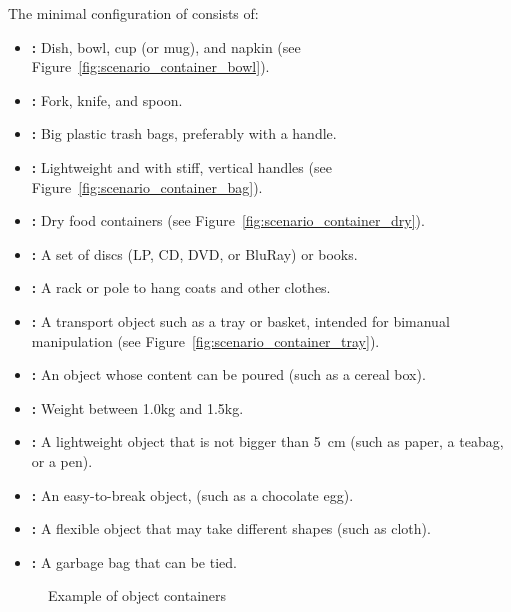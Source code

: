 The minimal configuration of \KnownObjects{} consists of:
\begin{itemize}
	\item \textbf{:} Dish, bowl, cup (or mug), and napkin (see Figure~\ref{fig:scenario_container_bowl}).
	\item \textbf{:} Fork, knife, and spoon.
	\item \textbf{:} Big plastic trash bags, preferably with a handle.
	\item \textbf{:} Lightweight and with stiff, vertical handles (see Figure~\ref{fig:scenario_container_bag}).
	\item \textbf{:} Dry food containers (see Figure~\ref{fig:scenario_container_dry}).
	\item \textbf{:} A set of discs (LP, CD, DVD, or BluRay) or books.
	\item \textbf{:} A rack or pole to hang coats and other clothes.
	\item \textbf{:} A transport object such as a tray or basket, intended for bimanual manipulation (see Figure~\ref{fig:scenario_container_tray}).
	\item \textbf{:} An object whose content can be poured (such as a cereal box).
	\item \textbf{:} Weight between 1.0kg and 1.5kg.
	\item \textbf{:} A lightweight object that is not bigger than \SI{5}{\centi\meter} (such as paper, a teabag, or a pen).
	\item \textbf{:} An easy-to-break object, (such as a chocolate egg).
	\item \textbf{:} A flexible object that may take different shapes (such as cloth).
	\item \textbf{:} A garbage bag that can be tied.
\end{itemize}

\begin{figure}[H]
	\centering
	\caption{Example of object containers}
	\label{fig:scenario_containers}
\end{figure}

